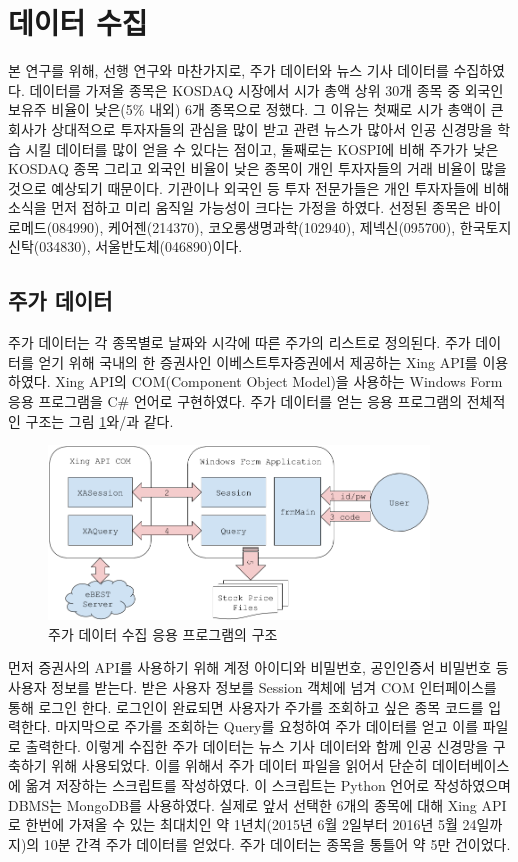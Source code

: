\documentclass[a4paper,10pt]{article}
\begin{document}
\section{데이터 수집}

본 연구를 위해, 선행 연구와 마찬가지로, 주가 데이터와 뉴스 기사 데이터를 수집하였다.
데이터를 가져올 종목은 KOSDAQ 시장에서 시가 총액 상위 30개 종목 중 외국인 보유주 비율이 낮은(5\% 내외) 6개 종목으로 정했다.
그 이유는 첫째로 시가 총액이 큰 회사가 상대적으로 투자자들의 관심을 많이 받고 관련 뉴스가 많아서 인공 신경망을 학습 시킬 데이터를 많이 얻을 수 있다는 점이고,
둘째로는 KOSPI에 비해 주가가 낮은 KOSDAQ 종목 그리고 외국인 비율이 낮은 종목이 개인 투자자들의 거래 비율이 많을 것으로 예상되기 때문이다.
기관이나 외국인 등 투자 전문가들은 개인 투자자들에 비해 소식을 먼저 접하고 미리 움직일 가능성이 크다는 가정을 하였다.
선정된 종목은 바이로메드(084990), 케어젠(214370), 코오롱생명과학(102940), 제넥신(095700), 한국토지신탁(034830), 서울반도체(046890)이다.

\subsection{주가 데이터}

주가 데이터는 각 종목별로 날짜와 시각에 따른 주가의 리스트로 정의된다.
주가 데이터를 얻기 위해 국내의 한 증권사인 이베스트투자증권에서 제공하는 Xing API를 이용하였다.
Xing API의 COM(Component Object Model)을 사용하는 Windows Form 응용 프로그램을 C\# 언어로 구현하였다.
주가 데이터를 얻는 응용 프로그램의 전체적인 구조는 그림 \ref{fig:getting_price}와/과 같다.
\begin{figure}[h]
\includegraphics[width=0.9\textwidth]{getting_price}
\centering
\caption{주가 데이터 수집 응용 프로그램의 구조}
\label{fig:getting_price}
\end{figure}
먼저 증권사의 API를 사용하기 위해 계정 아이디와 비밀번호, 공인인증서 비밀번호 등 사용자 정보를 받는다.
받은 사용자 정보를 Session 객체에 넘겨 COM 인터페이스를 통해 로그인 한다.
로그인이 완료되면 사용자가 주가를 조회하고 싶은 종목 코드를 입력한다.
마지막으로 주가를 조회하는 Query를 요청하여 주가 데이터를 얻고 이를 파일로 출력한다.
이렇게 수집한 주가 데이터는 뉴스 기사 데이터와 함께 인공 신경망을 구축하기 위해 사용되었다.
이를 위해서 주가 데이터 파일을 읽어서 단순히 데이터베이스에 옮겨 저장하는 스크립트를 작성하였다.
이 스크립트는 Python 언어로 작성하였으며 DBMS는 MongoDB를 사용하였다.
실제로 앞서 선택한 6개의 종목에 대해 Xing API로 한번에 가져올 수 있는 최대치인 약 1년치(2015년 6월 2일부터 2016년 5월 24일까지)의 10분 간격 주가 데이터를 얻었다.
주가 데이터는 종목을 통틀어 약 5만 건이었다.
\end{document}
